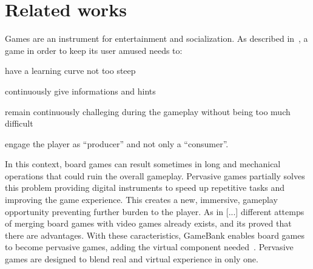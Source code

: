 \section{Related works}

Games are an instrument for entertainment and socialization. As described 
in~\cite{gee03}, a game in order to keep its user amused needs to:
\begin{enumerate*}[label=\roman*)]
 \item have a learning curve not too steep
 \item continuously give informations and hints
 \item remain continuously challeging during the gameplay without being too much
difficult
 \item engage the player as ``producer'' and not only a ``consumer''.
\end{enumerate*}
In this context, board games can result sometimes in long and mechanical 
operations that could ruin the overall gameplay. Pervasive games partially 
solves this problem providing digital instruments to speed up repetitive 
tasks and improving the game experience. This creates a new, immersive, 
gameplay opportunity preventing further burden to the player.
As in [...] different attemps of merging board games with video games already 
exists, and its proved that there are advantages.
With these caracteristics, GameBank enables board games to become pervasive 
games, adding the virtual component needed~\cite{arango17}. Pervasive games are 
designed to blend real and virtual experience in only one.